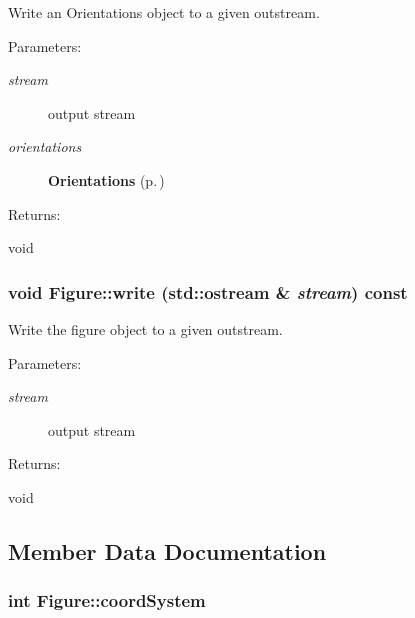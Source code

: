 Write an Orientations object to a given outstream. \begin{Desc}
\item[Parameters: ]\par
\begin{description}
\item[{\em 
stream}]output stream \item[{\em 
orientations}]{\bf Orientations} {\rm (p.\,\pageref{classFigure_s23})} \end{description}
\end{Desc}
\begin{Desc}
\item[Returns: ]\par
void \end{Desc}
\subsubsection{\setlength{\rightskip}{0pt plus 5cm}void Figure::write (std::ostream \& {\em stream}) const}\label{classFigure_a20}


Write the figure object to a given outstream. \begin{Desc}
\item[Parameters: ]\par
\begin{description}
\item[{\em 
stream}]output stream \end{description}
\end{Desc}
\begin{Desc}
\item[Returns: ]\par
void \end{Desc}


\subsection{Member Data Documentation}
\subsubsection{\setlength{\rightskip}{0pt plus 5cm}int Figure::coord\-System\hspace{0.3cm}{\tt  [private]}}\label{classFigure_o8}


